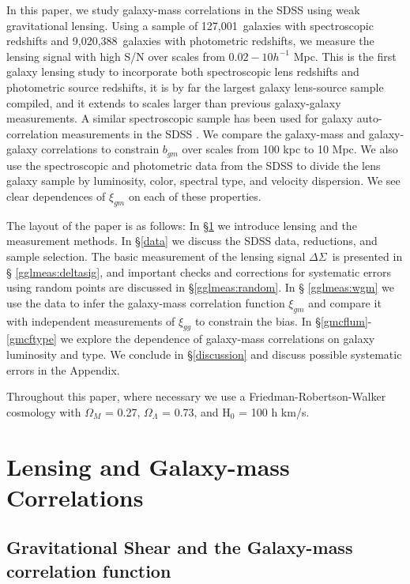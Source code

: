 \documentclass{emulateapj}
\newcommand{\deltasig}{$\Delta \Sigma$}
\newcommand{\numspec}{127,001}
\newcommand{\numsource}{9,020,388}
\begin{document}
In this paper, we study galaxy-mass correlations in the SDSS using weak
gravitational lensing.  Using a sample of \numspec\ galaxies with 
spectroscopic redshifts and \numsource\ galaxies with photometric redshifts, 
we measure the lensing signal with high S/N over scales from $0.02-10 h^{-1}$ Mpc.  
This is the first galaxy lensing study to incorporate both spectroscopic 
lens redshifts and photometric source redshifts, it is by far the 
largest galaxy lens-source sample compiled, and it extends to scales 
larger than previous galaxy-galaxy measurements. A similar spectroscopic 
sample has been used for galaxy auto-correlation 
measurements in the SDSS \citep{Zehavi03}. 
We compare the galaxy-mass and galaxy-galaxy correlations to constrain $b_{gm}$ 
over scales from 100 kpc to 10 Mpc.  We also use the spectroscopic
and photometric data from the SDSS to divide the lens galaxy sample by 
luminosity, color, spectral type, and velocity dispersion.  We see clear
dependences of $\xi_{gm}$ on each of these properties.

The layout of the paper is as follows: In \S \ref{lensing} we introduce lensing
and the measurement methods.  In \S \ref{data} we discuss the SDSS data, reductions,
and sample selection.  The basic measurement of the lensing 
signal \deltasig\ is presented in \S
\ref{gglmeas:deltasig}, and important checks and corrections for systematic
errors using random points are discussed in \S \ref{gglmeas:random}. In \S
\ref{gglmeas:wgm} we use the data to infer the galaxy-mass correlation 
function $\xi_{gm}$ and compare it with independent measurements 
of $\xi_{gg}$ to constrain the bias.
In \S \ref{gmcflum}-\ref{gmcftype} we explore 
the dependence of galaxy-mass correlations on galaxy luminosity and type.  
We conclude in \S \ref{discussion} and discuss 
possible systematic errors in the Appendix.

Throughout this paper, 
where necessary we use a Friedman-Robertson-Walker cosmology with
$\Omega_M$ = 0.27, $\Omega_{\Lambda}$ = 0.73, and H$_0$ = 100 h km/s.

\section{Lensing and Galaxy-mass Correlations} \label{lensing}

\subsection{Gravitational Shear and the Galaxy-mass correlation function} 
\label{lensing:shear}
\end{document}
